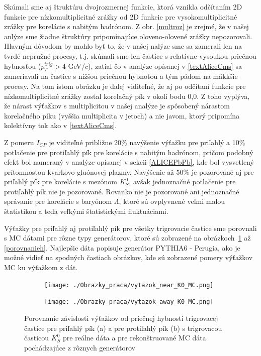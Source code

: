 \documentclass[thesismargins, thesislinespacing]{rnthesis}
\begin{document}
Skúmali sme aj štruktúru dvojrozmernej funkcie, ktorá vznikla odčítaním 2D funkcie pre nízkomultiplicitné zrážky od 2D funk\-cie pre vysokomultiplicitné zrážky pre korelácie s nabitým hadrónom. Z obr. \ref{multroz} je zrejmé, že v našej anlýze sme žiadne štruktúry pripomínajúce oloveno-olovené zrážky nepozorovali. Hlavným dôvodom by mohlo byť to, že v našej nalýze sme sa zamerali len na tvrdé nepružné procesy, t.j. skúmali sme len častice s relatívne vysoukou priečnou hybnosťou ($p_{T}^{trig}>4$ GeV/$c$), zatiaľ čo v analýze opísanej v \ref{textAliceCms} sa zameriavali na častice s nižšou priečnou hybnoťou a tým pádom na mäkkšie procesy. 
Na tom istom obrázku je ďalej viditeľné, že aj po odčítaní funkcie pre nízkomultiplicitné zrážky zostal korelačný pík v okolí bodu 0,0. Z toho vyplýva, že nárast výťažkov s multiplicitou v našej analýze je spôsobený nárastom korelačného píku (vyššia multiplicita v jetoch) a nie javom, ktorý pripomína kolektívny tok ako v \ref{textAliceCms}.

Z pomeru $I_{CP}$ je viditeľné približne 20\% navýšenie výťažku pre priľahlý a 10\% potlačenie pre protiľahlý pík pre korelácie s nabitým hadrónom, pričom podobný efekt bol nameraný v analýze opísanej v sekcii \ref{ALICEPbPb}, kde bol vysvetlený prítomnosťou kvarkovo-gluónovej plazmy. 
Navýšenie až 50\% je pozorované aj pre priľahlý pík pre korelácie s mezónom $K_{S}^{0}$, avšak jednoznačné potlačenie pre protiľahlý pík nie je pozorované. Rovanko nie je pozorované ani jednoznačné správanie pre korelácie s baryónom $\Lambda$, ktoré sú ovplyvnené veľmi malou štatistikou a teda veľkými štatistickými fluktuáciami. 

Výťažky pre priľahlý aj protiľahlý pík pre všetky trigrovacie častice sme porovnali s MC dátami pre rôzne typy generátorov, ktoré sú zobrazené na obrázkoch~\ref{porovnanie} až \ref{porovnanieh}. Najlepšie dáta popisuje generátor PYTHIA6 - Perugia, ako je možné vidieť na spodných častiach obrázkov, kde sú zobrazené pomery výťažkov MC ku výťažkom z dát.

\begin{figure}[hbtp!]
	\centering
	\begin{subfigure}{0.5\textwidth}
		\centering
		\texttt{[image: ./Obrazky\_praca/vytazok\_near\_K0\_MC.png]}
		\caption{}
	\end{subfigure}%
	\begin{subfigure}{0.5\textwidth}
		\centering
		\texttt{[image: ./Obrazky\_praca/vytazok\_away\_K0\_MC.png]}
		\caption{}
	\end{subfigure}
	\caption{Porovnanie závislosti výťažkov od priečnej hybnosti trigrovacej častice pre priľahlý pík (a) a pre protiľahlý pík (b) s trigrovacou časticou $K^0_S$ pre reálne dáta a pre rekonštruované MC dáta pochádzajúce z rôznych generátorov}
	\label{porovnanie}
\end{figure}
\end{document}
